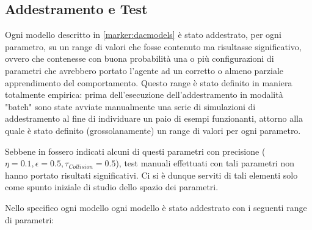\newpage

\subsection{Addestramento e Test}

Ogni modello descritto in \ref{marker:dacmodels} è stato addestrato, per ogni parametro, su un range di valori che fosse contenuto ma risultasse significativo, ovvero che contenesse con buona probabilità una o più configurazioni di parametri che avrebbero portato l'agente ad un corretto o almeno parziale apprendimento del comportamento. Questo range è stato definito in maniera totalmente empirica: prima dell'esecuzione dell'addestramento in modalità "batch" sono state avviate manualmente una serie di simulazioni di addestramento al fine di individuare un paio di esempi funzionanti, attorno alla quale è stato definito (grossolanamente) un range di valori per ogni parametro.

Sebbene in \cite{verschure1992distributed} fossero indicati alcuni di questi parametri con precisione ($\eta = 0.1, \epsilon = 0.5, \tau_{Collision} = 0.5$), test manuali effettuati con tali parametri non hanno portato risultati significativi. Ci si è dunque serviti di tali elementi solo come spunto iniziale di studio dello spazio dei parametri.

Nello specifico ogni modello ogni modello è stato addestrato con i seguenti range di parametri:

